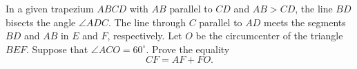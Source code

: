 In a given trapezium $ ABCD $ with $ AB$ parallel to $ CD $ and $ AB > CD $,  the line $ BD $ bisects the angle $ \angle ADC $. The line through $ C $ parallel to $ AD $ meets the segments $ BD $ and $ AB $ in $ E $ and $ F $,  respectively. Let $ O $ be the circumcenter of the triangle $ BEF $. Suppose that $ \angle ACO = 60^{\circ} $. Prove the equality\[ CF = AF + FO .\]